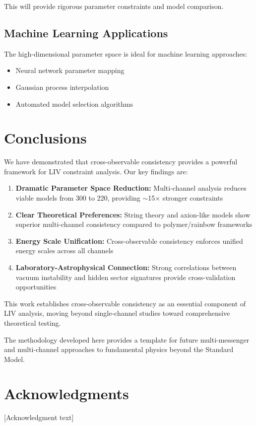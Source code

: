 \documentclass[12pt]{article}
\begin{document}
This will provide rigorous parameter constraints and model comparison.

\subsection{Machine Learning Applications}

The high-dimensional parameter space is ideal for machine learning approaches:
\begin{itemize}
\item Neural network parameter mapping
\item Gaussian process interpolation
\item Automated model selection algorithms
\end{itemize}

\section{Conclusions}

We have demonstrated that cross-observable consistency provides a powerful framework for LIV constraint analysis. Our key findings are:

\begin{enumerate}
\item \textbf{Dramatic Parameter Space Reduction:} Multi-channel analysis reduces viable models from 300 to 220, providing $\sim$15$\times$ stronger constraints

\item \textbf{Clear Theoretical Preferences:} String theory and axion-like models show superior multi-channel consistency compared to polymer/rainbow frameworks

\item \textbf{Energy Scale Unification:} Cross-observable consistency enforces unified energy scales across all channels

\item \textbf{Laboratory-Astrophysical Connection:} Strong correlations between vacuum instability and hidden sector signatures provide cross-validation opportunities
\end{enumerate}

This work establishes cross-observable consistency as an essential component of LIV analysis, moving beyond single-channel studies toward comprehensive theoretical testing.

The methodology developed here provides a template for future multi-messenger and multi-channel approaches to fundamental physics beyond the Standard Model.

\section*{Acknowledgments}

[Acknowledgment text]



\end{document}

